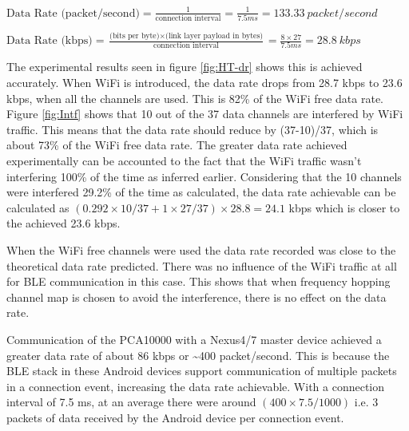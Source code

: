 $\mbox{Data Rate  (packet/second)}=\frac{1}{\mbox{connection interval}}=\frac{1}{7.5ms}=133.33\:packet/second$

\vspace{15 pt}
$\mbox{Data Rate (kbps)}=\frac{\mbox{(bits per byte)}\times\mbox{(link layer payload in bytes)}}{\mbox{connection interval}}=\frac{8\times27}{7.5ms}=28.8\:kbps$
\vspace{10 pt}

The experimental results seen in figure \ref{fig:HT-dr} shows this is achieved accurately. When WiFi is introduced, the data rate drops from 28.7 kbps to 23.6 kbps, when all the channels are used. This is 82\% of the WiFi free data rate. Figure \ref{fig:Intf} shows that 10 out of the 37 data channels are interfered by WiFi traffic. This means that the data rate should reduce by (37-10)/37, which is about 73\% of the WiFi free data rate. The greater data rate achieved experimentally can be accounted to the fact that the WiFi traffic wasn't interfering 100\% of the time as inferred earlier. Considering that the 10 channels were interfered 29.2\% of the time as calculated, the data rate achievable can be calculated as $(0.292\times10/37 + 1\times27/37)\times28.8=24.1$ kbps which is closer to the achieved 23.6 kbps.

When the WiFi free channels were used the data rate recorded was close to the theoretical data rate predicted. There was no influence of the WiFi traffic at all for BLE communication in this case. This shows that when frequency hopping channel map is chosen to avoid the interference, there is no effect on the data rate.

Communication of the PCA10000 with a Nexus4/7 master device achieved a greater data rate of about 86 kbps or \textasciitilde400 packet/second. This is because the BLE stack in these Android devices support communication of multiple packets in a connection event, increasing the data rate achievable. With a connection interval of 7.5 ms, at an average there were around $(400\times7.5/1000)$ i.e. 3 packets of data received by the Android device per connection event.

